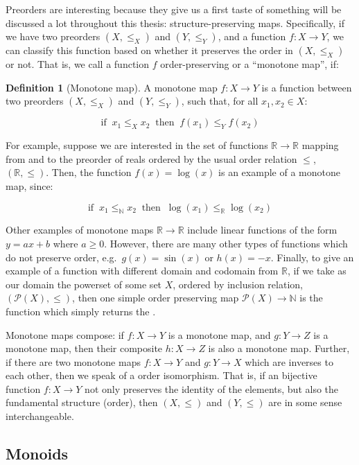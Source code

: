 \documentclass[
]{book}
\theoremstyle{definition}
\newtheorem{definition}{Definition}[chapter]
\theoremstyle{definition}
\theoremstyle{definition}
\theoremstyle{definition}
\theoremstyle{remark}
\begin{document}
Preorders are interesting because they give us a first taste of something will be discussed a lot throughout this thesis: structure-preserving maps. Specifically, if we have two preorders \((X, \leq_X)\) and \((Y, \leq_Y)\), and a function \(f: X \to Y\), we can classify this function based on whether it preserves the order in \((X, \leq_X)\) or not. That is, we call a function \(f\) order-preserving or a ``monotone map'', if:

\begin{definition}[Monotone map]
A monotone map \(f: X \to Y\) is a function between two preorders \((X, \leq_X)\) and \((Y, \leq_Y)\), such that, for all \(x_1, x_2 \in X\):

\[\text{if} \;\; x_1 \leq_X x_2 \;\; \text{then} \;\; f(x_1) \leq_Y f(x_2) \]
\end{definition}

For example, suppose we are interested in the set of functions \(\mathbb{R} \to \mathbb{R}\) mapping from and to the preorder of reals ordered by the usual order relation \(\leq\), \((\mathbb{R}, \leq)\). Then, the function \(f(x) = \log(x)\) is an example of a monotone map, since:

\[\text{if} \;\; x_1 \leq_{\mathbb{N}} x_2 \;\; \text{then} \;\; \log(x_1) \leq_{\mathbb{R}} \log(x_2)\]

Other examples of monotone maps \(\mathbb{R} \to \mathbb{R}\) include linear functions of the form \(y = ax + b\) where \(a \geq 0\). However, there are many other types of functions which do not preserve order, e.g.~\(g(x) = \sin(x)\) or \(h(x) = -x\). Finally, to give an example of a function with different domain and codomain from \(\mathbb{R}\), if we take as our domain the powerset of some set \(X\), ordered by inclusion relation, \((\mathcal{P}(X), \leq)\), then one simple order preserving map \(\mathcal{P}(X) \to \mathbb{N}\) is the function which simply returns the .

Monotone maps compose: if \(f: X \to Y\) is a monotone map, and \(g: Y \to Z\) is a monotone map, then their composite \(h: X \to Z\) is also a monotone map. Further, if there are two monotone maps \(f: X \to Y\) and \(g: Y \to X\) which are inverses to each other, then we speak of a order isomorphism. That is, if an bijective function \(f: X \to Y\) not only preserves the identity of the elements, but also the fundamental structure (order), then \((X, \leq)\) and \((Y, \leq)\) are in some sense interchangeable.

\subsection{Monoids}\label{monoids}
\end{document}
